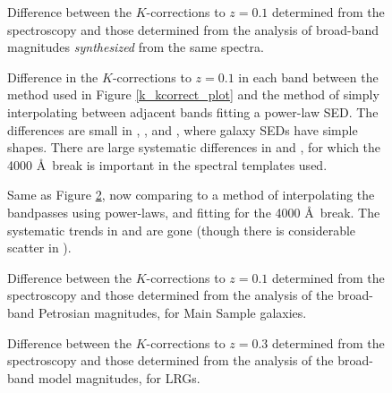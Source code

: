 \clearpage
{}
\begin{figure}
\figurenum{\fignum}
\caption{\label{k_speck_plot.fitfib.0.1} Difference between the
$K$-corrections to $z=0.1$ determined from the spectroscopy and those
determined from the analysis of broad-band magnitudes {\it
synthesized} from the same spectra.}
\end{figure}

\clearpage
{}
\begin{figure}
\figurenum{\fignum}
\caption{\label{compareci} Difference in the $K$-corrections to
$z=0.1$ in each band between the method used in Figure
\ref{k_kcorrect_plot} and the method of simply interpolating between
adjacent bands fitting a power-law SED. The differences are small in
, , and , where galaxy SEDs
have simple shapes. There are large systematic differences in
 and , for which the 4000 \AA\ break is
important in the spectral templates used. }
\end{figure}

\clearpage
{}
\begin{figure}
\figurenum{\fignum}
\caption{\label{comparecibreak} Same as Figure \ref{compareci},
now comparing to a method of interpolating the bandpasses using
power-laws, and fitting for the 4000 \AA\ break. The systematic trends
in  and  are gone (though there is
considerable scatter in ). }
\end{figure}

\clearpage
{}
\begin{figure}
\figurenum{\fignum}
\caption{\label{k_speck_plot.0.1} Difference between the
$K$-corrections to $z=0.1$ determined from the spectroscopy and those
determined from the analysis of the broad-band Petrosian magnitudes, for
Main Sample galaxies.}
\end{figure}

\clearpage
{}
\begin{figure}
\figurenum{\fignum}
\caption{\label{k_speck_plot.0.3} Difference between the
$K$-corrections to $z=0.3$ determined from the spectroscopy and those
determined from the analysis of the broad-band model magnitudes, for
LRGs.}
\end{figure}

